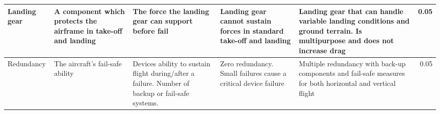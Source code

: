 \begin{table}[H]
{\begin{tabular}{|p{2cm}|p{4cm}|p{4cm}|p{4cm}|p{4cm}|r|}
Landing gear                                  & A component which protects the airframe in take-off and landing                                          & The force the landing gear can support before fail                                                                                                          & Landing gear cannot sustain forces in standard take-off and landing & Landing gear that can handle variable landing conditions and ground terrain. Is multipurpose and does not increase drag & 0.05      \\ \hline
Redundancy                                    & The aircraft's fail-safe ability                                                                           & Devices ability to sustain flight during/after a failure. Number of backup or fail-safe systems.                                                            & Zero redundancy. Small failures cause a critical device failure     & Multiple redundancy with back-up components and fail-safe measures for both horizontal and vertical flight              & 0.05      \\ \hline
\end{tabular}%
}
\end{table}




